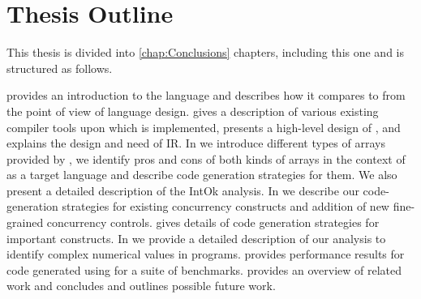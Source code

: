 \section{Thesis Outline}

This thesis is divided into \ref{chap:Conclusions} chapters, including this one
and is structured as follows. 

 provides an introduction to the \xten language and describes
how it compares to \matlab from the point of view of language design.
 gives a description of various existing \matlab
compiler tools upon which \mixten is implemented, presents a high-level
design of \mixten, and explains the design and need of \mixten IR. 
In  we introduce different types of arrays provided by
\xten,  we identify pros and cons of both kinds of arrays in the context of 
\xten as a target language and describe code generation strategies for them. We
also present a detailed description of the IntOk analysis.
In  we describe our code-generation strategies for
existing \matlab concurrency constructs and addition of new fine-grained
concurrency controls.
 gives details of code generation strategies for
important \matlab constructs.
In  we provide a detailed description of our analysis to
identify complex numerical values in \matlab programs. 
 provides performance results for code generated using
\mixten for a suite of benchmarks.
 provides an overview of related work and
 concludes and outlines possible future work.
